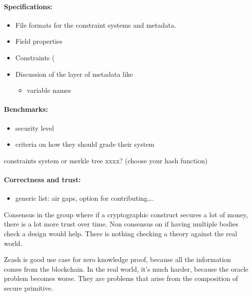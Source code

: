 \paragraph{Specifications:}

\begin{itemize}[label={- }]
\item File formats for the constraint systems and metadata.
\item Field properties
\item Constraints (
\item Discussion of the layer of metadata like
			\begin{itemize}[label={- }]
			\item variable names
			\end{itemize}
\end{itemize}


\paragraph{Benchmarks:}
\begin{itemize}[label={- }]
\item security level
\item criteria on how they should grade their system
\end{itemize}
constraints system or merkle tree xxxx? (choose your hash function)


\paragraph{Correctness and trust:}
\begin{itemize}[label={- }]
\item generic list: air gaps, option for contributing….
\end{itemize}


Consensus in the group where if a cryptographic construct secures a lot of money, there is a lot
more trust over time. Non consensus on if having multiple bodies check a design would help.
There is nothing checking a theory against the real world.


Zcash is good use case for zero knowledge proof, because all the information comes from the
blockchain. In the real world, it's much harder, because the oracle problem becomes worse.
They are problems that arise from the composition of secure primitive.




